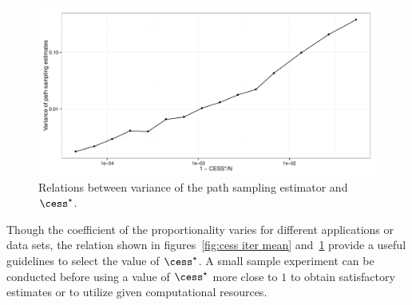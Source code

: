 \begin{figure}[t]
  \includegraphics[width=\linewidth]{fig/CESS_Path_Var}
  \caption{Relations between variance of the path sampling estimator and
    $\cess^\star$.}
  \label{fig:cess path var}
\end{figure}

Though the coefficient of the proportionality varies for different
applications or data sets, the relation shown in figures~\ref{fig:cess iter
  mean} and~\ref{fig:cess path var} provide a useful guidelines to select the
value of $\cess^\star$. A small sample experiment can be conducted before using a
value of $\cess^\star$ more close to $1$ to obtain satisfactory estimates or to
utilize given computational resources.

